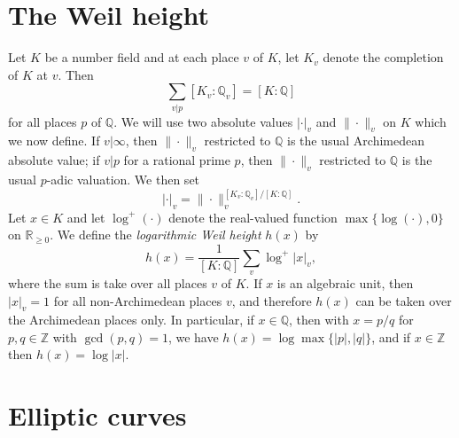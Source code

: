 \section{The Weil height}
\label{sec:WeilHeight}

Let $K$ be a number field and at each place $v$ of $K$, let $K_v$ denote the completion of $K$ at $v$. Then
\[\sum_{v|p} [K_v:\mathbb{Q}_v] = [K:\mathbb{Q}]\]
for all places $p$ of $\mathbb{Q}$. We will use two absolute values $| \cdot |_v$ and $\| \cdot \|_v$ on $K$ which we now define. If $v|\infty$, then $\| \cdot \|_v$ restricted to $\mathbb{Q}$ is the usual Archimedean absolute value; if $v|p$ for a rational prime $p$, then $\| \cdot \|_v$ restricted to $\mathbb{Q}$ is the usual $p$-adic valuation. We then set
\[ | \cdot |_v = \| \cdot \|_v^{[K_v:\mathbb{Q}_v]/[K:\mathbb{Q}]}.\]
Let $x \in K$ and let $\log^+(\cdot)$ denote the real-valued function $\max\{\log(\cdot),0\}$ on $\mathbb{R}_{\geq 0}$. We define the \textit{logarithmic Weil height} $h(x)$ by 
\[h(x) = \frac{1}{[K:\mathbb{Q}]}\sum_v \log^+|x|_v,\]
where the sum is take over all places $v$ of $K$. If $x$ is an algebraic unit, then $|x|_v = 1$ for all non-Archimedean places $v$, and therefore $h(x)$ can be taken over the Archimedean places only. 
In particular, if $x \in \mathbb{Q}$, then with $x = p/q$ for $p,q \in \mathbb{Z}$ with $\gcd(p,q) = 1$, we have $h(x) = \log\max\{|p|,|q|\}$, and if $x \in \mathbb{Z}$ then $h(x) = \log|x|$. 


\section{Elliptic curves}
\label{sec:EllipticCurves}


